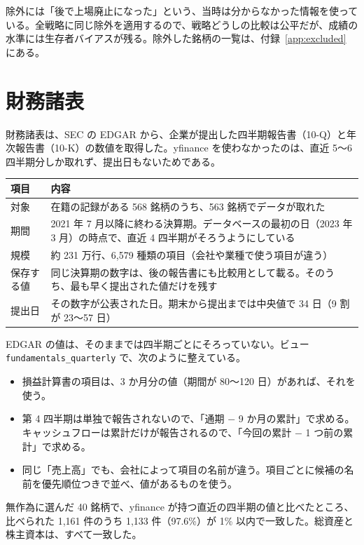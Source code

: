 \documentclass[xelatex,ja=standard,jafont=hiragino-pron,a4paper,10pt]{bxjsreport}
\newcommand{\code}[1]{\texttt{#1}}
\begin{document}
除外には「後で上場廃止になった」という、当時は分からなかった情報を使っている。全戦略に同じ除外を適用するので、戦略どうしの比較は公平だが、成績の水準には生存者バイアスが残る。除外した銘柄の一覧は、付録~\ref{app:excluded} にある。

\section{財務諸表}

財務諸表は、SEC の EDGAR から、企業が提出した四半期報告書（10-Q）と年次報告書（10-K）の数値を取得した。yfinance を使わなかったのは、直近 5〜6 四半期分しか取れず、提出日もないためである。

\begin{longtable}{p{3.60cm}p{10.80cm}}
\toprule
\textbf{項目} & \textbf{内容} \\
\midrule
\endfirsthead
\bottomrule
\endfoot
対象 & 在籍の記録がある 568 銘柄のうち、563 銘柄でデータが取れた \\
期間 & 2021 年 7 月以降に終わる決算期。データベースの最初の日（2023 年 3 月）の時点で、直近 4 四半期がそろうようにしている \\
規模 & 約 231 万行、6,579 種類の項目（会社や業種で使う項目が違う） \\
保存する値 & 同じ決算期の数字は、後の報告書にも比較用として載る。そのうち、最も早く提出された値だけを残す \\
提出日 & その数字が公表された日。期末から提出までは中央値で 34 日（9 割が 23〜57 日） \\
\end{longtable}

EDGAR の値は、そのままでは四半期ごとにそろっていない。ビュー \code{fundamentals\_quarterly} で、次のように整えている。

\begin{itemize}
\item 損益計算書の項目は、3 か月分の値（期間が 80〜120 日）があれば、それを使う。
\item 第 4 四半期は単独で報告されないので、「通期 $-$ 9 か月の累計」で求める。キャッシュフローは累計だけが報告されるので、「今回の累計 $-$ 1 つ前の累計」で求める。
\item 同じ「売上高」でも、会社によって項目の名前が違う。項目ごとに候補の名前を優先順位つきで並べ、値があるものを使う。
\end{itemize}

無作為に選んだ 40 銘柄で、yfinance が持つ直近の四半期の値と比べたところ、比べられた 1,161 件のうち 1,133 件（97.6\%）が 1\% 以内で一致した。総資産と株主資本は、すべて一致した。
\end{document}
